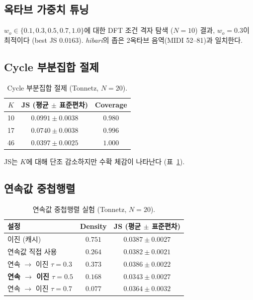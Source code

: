 \documentclass[11pt,a4paper]{article}
\begin{document}
\subsection{옥타브 가중치 튜닝}
\label{subsec:octave}

$w_o \in \{0.1, 0.3, 0.5, 0.7, 1.0\}$에 대한 DFT 조건 격자 탐색
($N = 10$) 결과, $w_o = 0.3$이 최적이다 (best JS $0.0163$).
\emph{hibari}의 좁은 2옥타브 음역(MIDI 52--81)과 일치한다.

\subsection{Cycle 부분집합 절제}

\begin{table}[H]
\centering
\caption{Cycle 부분집합 절제 (Tonnetz, $N=20$).}
\label{tab:ablation}
\begin{tabular}{ccc}
\toprule
$K$ & JS (평균 $\pm$ 표준편차) & Coverage \\
\midrule
10  & $0.0991 \pm 0.0038$ & $0.980$ \\
17  & $0.0740 \pm 0.0038$ & $0.996$ \\
46  & $\mathbf{0.0397 \pm 0.0025}$ & $1.000$ \\
\bottomrule
\end{tabular}
\end{table}

JS는 $K$에 대해 단조 감소하지만 수확 체감이 나타난다
(표~\ref{tab:ablation}).

\subsection{연속값 중첩행렬}
\label{subsec:continuous}

\begin{table}[H]
\centering
\caption{연속값 중첩행렬 실험 (Tonnetz, $N=20$).}
\label{tab:continuous}
\begin{tabular}{lcc}
\toprule
설정 & Density & JS (평균 $\pm$ 표준편차) \\
\midrule
이진 (캐시)                & $0.751$ & $0.0387 \pm 0.0027$ \\
연속값 직접 사용            & $0.264$ & $0.0382 \pm 0.0021$ \\
연속 $\to$ 이진 $\tau{=}0.3$ & $0.373$ & $0.0386 \pm 0.0022$ \\
\textbf{연속 $\to$ 이진 $\tau{=}0.5$} & $\mathbf{0.168}$ & $\mathbf{0.0343 \pm 0.0027}$ \\
연속 $\to$ 이진 $\tau{=}0.7$ & $0.077$ & $0.0364 \pm 0.0032$ \\
\bottomrule
\end{tabular}
\end{table}
\end{document}
